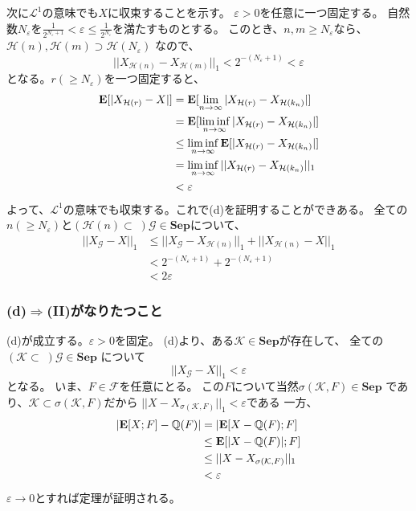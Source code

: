       次に$\mathcal{L}^1$の意味でも$X$に収束することを示す。
      $\varepsilon >0$を任意に一つ固定する。
      自然数$N_{\varepsilon}$を$\displaystyle{\frac{1}{2^{N_{\varepsilon}+1}} < \varepsilon \leq \frac{1}{2^{N_{\varepsilon}}}}$を満たすものとする。
      このとき、$n,m \ge N_{\varepsilon}$なら、
      $\mathcal{H}(n),\mathcal{H}(m) \supset \mathcal{H}(N_{\varepsilon})$
      なので、
      \[
        ||X_{\mathcal{H}(n)} - X_{\mathcal{H}(m)}||_1 < 2^{-(N_{\varepsilon}+1)} < \varepsilon
      \]
      となる。$r (\ge N_{\varepsilon})$を一つ固定すると、
      \begin{align*}
        {\mathbf{E}}[|X_{\mathcal{H}(r)} - X|] &= {\mathbf{E}}[\lim_{n \to \infty}|X_{\mathcal{H}(r)} - X_{\mathcal{H}(k_n)}|]\\
        &= {\mathbf{E}}[\liminf_{n \to \infty}|X_{\mathcal{H}(r)} - X_{\mathcal{H}(k_n)}|]\\
        &\leq \liminf_{n \to \infty}{\mathbf{E}}[|X_{\mathcal{H}(r)} - X_{\mathcal{H}(k_n)}|]\\
        &= \liminf_{n \to \infty}||X_{\mathcal{H}(r)} - X_{\mathcal{H}(k_n)}||_1 \\
        &< \varepsilon
      \end{align*}
      よって、$\mathcal{L}^1$の意味でも収束する。これで(d)を証明することができある。
      全ての$n(\ge N_{\varepsilon})$と$(\mathcal{H}(n) \subset \;)\mathcal{G} \in \mathbf{Sep}$について、
      \begin{align*}
        ||X_{\mathcal{G}} - X||_1 &\leq ||X_{\mathcal{G}} - X_{\mathcal{H}(n)}||_1 + ||X_{\mathcal{H}(n)} - X||_1\\
        &< 2^{-(N_{\varepsilon} + 1)} + 2^{-(N_{\varepsilon} + 1)}\\
        &< 2\varepsilon
      \end{align*}
    \subsubsection{(d)$\Rightarrow$(II)がなりたつこと}
      (d)が成立する。$\varepsilon > 0 $を固定。
      (d)より、ある$\mathcal{K} \in \mathbf{Sep}$が存在して、
      全ての$(\mathcal{K} \subset \;)\mathcal{G} \in \mathbf{Sep}$
      について
      \[||X_{\mathcal{G}} - X||_1 < \varepsilon\]
      となる。
      いま、$F \in \mathcal{F}$を任意にとる。
      この$F$について当然$\sigma(\mathcal{K},F) \in \mathbf{Sep}$
      であり、$\mathcal{K} \subset \sigma(\mathcal{K},F)$だから
      $||X - X_{\sigma(\mathcal{K},F)}||_1 < \varepsilon $である
      一方、
      \begin{align*}
        |{\mathbf{E}}[X;F] - \mathbb{Q}(F)| &= |{\mathbf{E}}[X - \mathbb{Q}(F) ; F]\\
        &\leq {\mathbf{E}}[|X - \mathbb{Q}(F)| ; F]\\
        &\leq ||X - X_{\sigma(\mathcal{K},F)}||_1\\
        &< \varepsilon
      \end{align*}
      $\varepsilon \rightarrow 0$とすれば定理が証明される。

